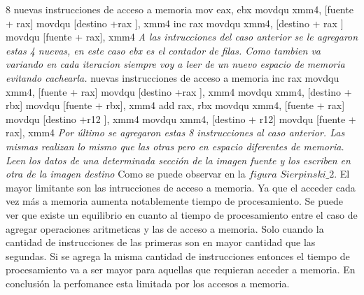 \documentclass[a4paper]{article}
\begin{document}
8 nuevas instrucciones de acceso a memoria\newline	
mov eax, ebx\newline
movdqu xmm4, [fuente + rax]\newline
movdqu [destino +rax ], xmm4\newline
inc rax	\newline
movdqu xmm4, [destino + rax ]\newline
movdqu [fuente + rax], xmm4\newline
\textit{ A las intrucciones del caso anterior se le agregaron estas 4 nuevas, en este caso ebx es el contador de filas. Como tambien va variando en cada iteracion siempre voy a leer de un nuevo espacio de memoria evitando cachearla.} nuevas instrucciones de acceso a memoria\newline
inc rax\newline
movdqu xmm4, [fuente + rax]\newline
movdqu [destino +rax ], xmm4	\newline
movdqu xmm4, [destino + rbx]\newline
movdqu [fuente + rbx], xmm4\newline
add rax, rbx	\newline
movdqu xmm4, [fuente + rax]\newline
movdqu [destino +r12 ], xmm4	\newline
movdqu xmm4, [destino + r12]\newline
movdqu [fuente + rax], xmm4\newline
\textit{Por último se agregaron estas 8 instrucciones al caso anterior. Las mismas realizan lo mismo que las otras pero en espacio diferentes de memoria. Leen los datos de una determinada sección de la imagen fuente y los escriben en otra de la imagen destino}\newline
Como se puede observar en la $figura$ $Sierpinski\_2$. El mayor limitante son las intrucciones de acceso a memoria. Ya que el acceder cada vez más a memoria aumenta notablemente tiempo de procesamiento. Se puede ver que existe un equilibrio en cuanto al tiempo de procesamiento entre el caso de agregar operaciones aritmeticas y las de acceso a memoria. Solo cuando la cantidad de instrucciones de las primeras son en mayor cantidad que las segundas. Si se agrega la misma cantidad de instrucciones entonces el tiempo de procesamiento va a ser mayor para aquellas que requieran acceder a memoria. En conclusión la perfomance esta limitada por los accesos a memoria.  
\newpage
\end{document}
